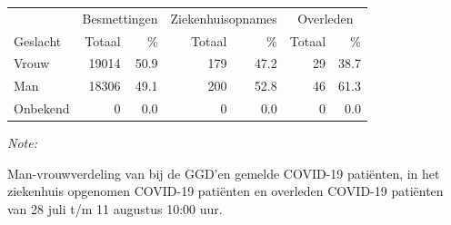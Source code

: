 \documentclass[
  english,
  man,floatsintext]{apa6}
\begin{document}
\begin{table}
\centering\begingroup\fontsize{11}{13}\selectfont

\begin{threeparttable}
\begin{tabular}{lrrrrrr}
\toprule
\multicolumn{1}{c}{ } & \multicolumn{2}{c}{Besmettingen} & \multicolumn{2}{c}{Ziekenhuisopnames} & \multicolumn{2}{c}{Overleden} \\
\cmidrule(l{3pt}r{3pt}){2-3} \cmidrule(l{3pt}r{3pt}){4-5} \cmidrule(l{3pt}r{3pt}){6-7}
Geslacht & Totaal & \% & Totaal & \% & Totaal & \%\\
\midrule
Vrouw & 19014 & 50.9 & 179 & 47.2 & 29 & 38.7\\
Man & 18306 & 49.1 & 200 & 52.8 & 46 & 61.3\\
Onbekend & 0 & 0.0 & 0 & 0.0 & 0 & 0.0\\
\bottomrule
\end{tabular}
\begin{tablenotes}
\item \textit{Note: } 
\item Man-vrouwverdeling van bij de GGD’en gemelde COVID-19 patiënten, in het ziekenhuis opgenomen COVID-19 patiënten en overleden COVID-19 patiënten van 28 juli t/m 11 augustus 10:00 uur.
\end{tablenotes}
\end{threeparttable}
\endgroup{}
\end{table}
\newpage
\end{document}
